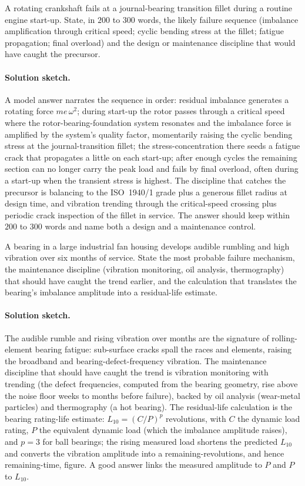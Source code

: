 \begin{exercise}
A rotating crankshaft fails at a journal-bearing transition fillet
during a routine engine start-up. State, in $200$ to $300$ words, the
likely failure sequence (imbalance amplification through critical
speed; cyclic bending stress at the fillet; fatigue propagation;
final overload) and the design or maintenance discipline that would
have caught the precursor.
\paragraph{Solution sketch.} A model answer narrates the sequence in
order: residual imbalance generates a rotating force $m e\,\omega^{2}$;
during start-up the rotor passes through a critical speed where the
rotor-bearing-foundation system resonates and the imbalance force is
amplified by the system's quality factor, momentarily raising the
cyclic bending stress at the journal-transition fillet; the
stress-concentration there seeds a fatigue crack that propagates a
little on each start-up; after enough cycles the remaining section can
no longer carry the peak load and fails by final overload, often
during a start-up when the transient stress is highest. The discipline
that catches the precursor is balancing to the ISO~1940/1 grade plus a
generous fillet radius at design time, and vibration trending through
the critical-speed crossing plus periodic crack inspection of the
fillet in service. The answer should keep within $200$ to $300$ words
and name both a design and a maintenance control.
\end{exercise}

\begin{exercise}
A bearing in a large industrial fan housing develops audible
rumbling and high vibration over six months of service. State the
most probable failure mechanism, the maintenance discipline (vibration
monitoring, oil analysis, thermography) that should have caught the
trend earlier, and the calculation that translates the bearing's
imbalance amplitude into a residual-life estimate.
\paragraph{Solution sketch.} The audible rumble and rising vibration
over months are the signature of rolling-element bearing fatigue:
sub-surface cracks spall the races and elements, raising the
broadband and bearing-defect-frequency vibration. The maintenance
discipline that should have caught the trend is vibration monitoring
with trending (the defect frequencies, computed from the bearing
geometry, rise above the noise floor weeks to months before failure),
backed by oil analysis (wear-metal particles) and thermography (a hot
bearing). The residual-life calculation is the bearing rating-life
estimate: $L_{10}=(C/P)^{p}$ revolutions, with $C$ the dynamic load
rating, $P$ the equivalent dynamic load (which the imbalance amplitude
raises), and $p=3$ for ball bearings; the rising measured load
shortens the predicted $L_{10}$ and converts the vibration amplitude
into a remaining-revolutions, and hence remaining-time, figure. A good
answer links the measured amplitude to $P$ and $P$ to $L_{10}$.
\end{exercise}

